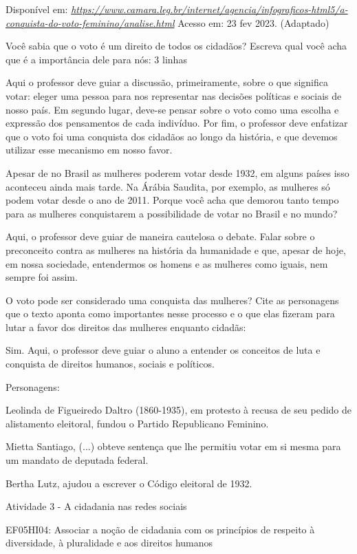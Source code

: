 Disponível em:
\href{https://www.camara.leg.br/internet/agencia/infograficos-html5/a-conquista-do-voto-feminino/analise.html}{\emph{https://www.camara.leg.br/internet/agencia/infograficos-html5/a-conquista-do-voto-feminino/analise.html}}
Acesso em: 23 fev 2023. (Adaptado)

Você sabia que o voto é um direito de todos os cidadãos? Escreva qual
você acha que é a importância dele para nós: 3 linhas

Aqui o professor deve guiar a discussão, primeiramente, sobre o que
significa votar: eleger uma pessoa para nos representar nas decisões
políticas e sociais de nosso país. Em segundo lugar, deve-se pensar
sobre o voto como uma escolha e expressão dos pensamentos de cada
indivíduo. Por fim, o professor deve enfatizar que o voto foi uma
conquista dos cidadãos ao longo da história, e que devemos utilizar esse
mecanismo em nosso favor.

Apesar de no Brasil as mulheres poderem votar desde 1932, em alguns
países isso aconteceu ainda mais tarde. Na Árábia Saudita, por exemplo,
as mulheres só podem votar desde o ano de 2011. Porque você acha que
demorou tanto tempo para as mulheres conquistarem a possibilidade de
votar no Brasil e no mundo?

Aqui, o professor deve guiar de maneira cautelosa o debate. Falar sobre
o preconceito contra as mulheres na história da humanidade e que, apesar
de hoje, em nossa sociedade, entendermos os homens e as mulheres como
iguais, nem sempre foi assim.

O voto pode ser considerado uma conquista das mulheres? Cite as
personagens que o texto aponta como importantes nesse processo e o que
elas fizeram para lutar a favor dos direitos das mulheres enquanto
cidadãs:

Sim. Aqui, o professor deve guiar o aluno a entender os conceitos de
luta e conquista de direitos humanos, sociais e políticos.

Personagens:

Leolinda de Figueiredo Daltro (1860-1935), em protesto à recusa de seu
pedido de alistamento eleitoral, fundou o Partido Republicano Feminino.

Mietta Santiago, (...) obteve sentença que lhe permitiu votar em si
mesma para um mandato de deputada federal.

Bertha Lutz, ajudou a escrever o Código eleitoral de 1932.

Atividade 3 - A cidadania nas redes sociais

EF05HI04: Associar a noção de cidadania com os princípios de respeito à
diversidade, à pluralidade e aos direitos humanos

